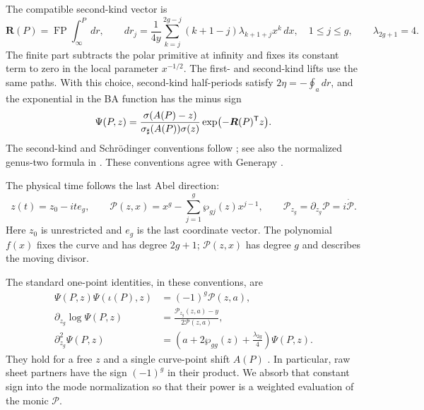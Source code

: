 The compatible second-kind vector is
\begin{equation}\label{eq:BA-second-kind}
 \boldsymbol R(P)=\operatorname{FP}\int_\infty^P dr,\qquad
 dr_j=\frac1{4y}\sum_{k=j}^{2g-j}
          (k+1-j)\lambda_{k+1+j}x^k\,dx,
 \quad1\leq j\leq g,\qquad \lambda_{2g+1}=4.
\end{equation}
The finite part subtracts the polar primitive at infinity and fixes
its constant term to zero in the local parameter $x^{-1/2}$.
The first- and second-kind lifts use the same paths. With this
choice, second-kind half-periods satisfy
$2\eta=-\oint_a dr$, and the exponential in the BA function has
the minus sign
\begin{equation}\label{eq:BA-generapy}
 \Psi(P,z)=\frac{\sigma(A(P)-z)}
 {\sigma_\sharp(A(P))\sigma(z)}
 \exp\bigl(-\boldsymbol R(P)^{\mathsf T}z\bigr).
\end{equation}
The second-kind and Schr\"odinger conventions follow
\cite{Christiansen2000}; see also the normalized genus-two formula in
\cite[equation (3.3)]{Braden2005}. These conventions agree with
Generapy \cite{Generapy}.

The physical time follows the last Abel direction:
\begin{equation}\label{eq:BA-time-polynomial}
 z(t)=z_0-it e_g,\qquad
 \mathcal P(z,x)=x^g-\sum_{j=1}^{g}\wp_{gj}(z)x^{j-1},
 \qquad \mathcal P_{z_g}=\partial_{z_g}\mathcal P=i\dot{\mathcal P}.
\end{equation}
Here $z_0$ is unrestricted and $e_g$ is the last coordinate vector.
The polynomial $f(x)$ fixes the curve and has degree $2g+1$;
$\mathcal P(z,x)$ has degree $g$ and describes the moving divisor.

The standard one-point identities, in these conventions, are
\begin{equation}\label{eq:BA-identities}
\begin{aligned}
 \Psi(P,z)\Psi(\iota(P),z)&=(-1)^g\mathcal P(z,a),\\
 \partial_{z_g}\log\Psi(P,z)
 &=\frac{\mathcal P_{z_g}(z,a)-y}{2\mathcal P(z,a)},\\
 \partial_{z_g}^2\Psi(P,z)
 &=\left(a+2\wp_{gg}(z)+\frac{\lambda_{2g}}4\right)\Psi(P,z).
\end{aligned}
\end{equation}
They hold for a free $z$ and a single curve-point shift $A(P)$
\cite{BEL1997,Eilbeck2000}. In particular, raw sheet partners have
the sign $(-1)^g$ in their product. We absorb that constant sign
into the mode normalization so that their power is a weighted
evaluation of the monic $\mathcal P$.

